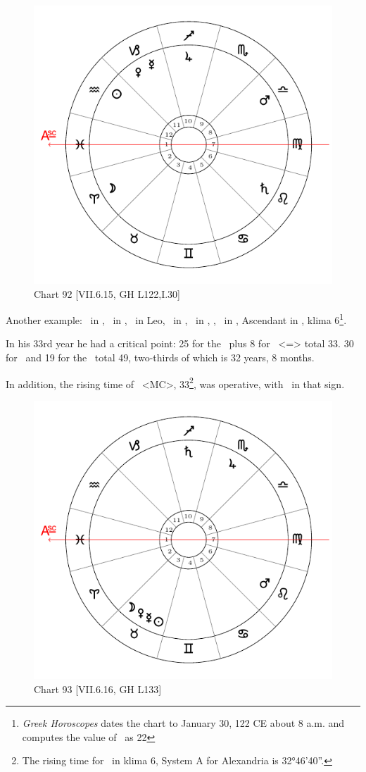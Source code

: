 \newpage
\begin{figure}
\centering
\includegraphics[width=.68\textwidth]{charts/7_6_15}
\caption{Chart 92 [VII.6.15, GH L122,I.30] }
\label{fig:chart92}
\end{figure} 

Another example: \Sun\, in \Aquarius, \Moon\, in \Aries, \Saturn\, in Leo, \Jupiter\, in \Sagittarius, \Mars\, in \Libra, \Venus, \Mercury\, in \Capricorn, Ascendant in \Pisces, klima 6\footnote{\textit{Greek Horoscopes} dates the chart to January 30, 122 CE about 8 a.m. and computes the value of \Venus\, as 22 \Aquarius}.

In his 33rd year he had a critical point: 25 for the \Moon\, plus 8 for \Libra\, <=\Venus> total 33. 30 for \Saturn\, and 19 for the \Sun\, total 49, two-thirds of which is 32 years, 8 months. 

In addition, the rising time of \Sagittarius\, <MC>, 33\footnote{The rising time for \Sagittarius\, in klima 6, System A for Alexandria is 32°46'40''.}, was operative, with \Jupiter\, in that sign.

\newpage
\begin{figure}
\centering
\includegraphics[width=.68\textwidth]{charts/7_6_16}
\caption{Chart 93 [VII.6.16, GH L133] }
\label{fig:chart93}
\end{figure} 

